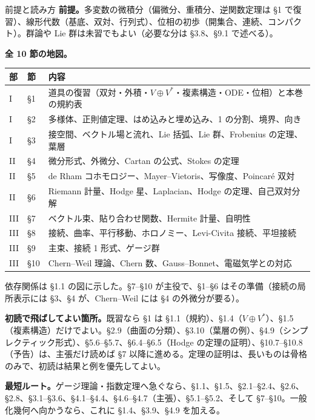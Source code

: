 \clearpage
\begin{keybox}{前提と読み方}
\small
\textbf{前提。}多変数の微積分（偏微分、重積分、逆関数定理は §1 で復習）、線形代数（基底、双対、行列式）、位相の初歩（開集合、連続、コンパクト）。群論や Lie 群は未習でもよい（必要な分は §3.8、§9.1 で述べる）。

\textbf{全 10 節の地図。}
\begin{center}\small
\renewcommand{\arraystretch}{1.2}
\begin{tabular}{@{}ll>{\raggedright\arraybackslash}p{9.2cm}@{}}
\toprule
部 & 節 & 内容 \\
\midrule
I & §1 & 道具の復習（双対・外積・$V\oplus V^*$・複素構造・ODE・位相）と本巻の規約表 \\
I & §2 & 多様体、正則値定理、はめ込みと埋め込み、1 の分割、境界、向き \\
I & §3 & 接空間、ベクトル場と流れ、Lie 括弧、Lie 群、Frobenius の定理、葉層 \\
II & §4 & 微分形式、外微分、Cartan の公式、Stokes の定理 \\
II & §5 & de Rham コホモロジー、Mayer--Vietoris、写像度、Poincaré 双対 \\
II & §6 & Riemann 計量、Hodge 星、Laplacian、Hodge の定理、自己双対分解 \\
III & §7 & ベクトル束、貼り合わせ関数、Hermite 計量、自明性 \\
III & §8 & 接続、曲率、平行移動、ホロノミー、Levi-Civita 接続、平坦接続 \\
III & §9 & 主束、接続 1 形式、ゲージ群 \\
III & §10 & Chern--Weil 理論、Chern 数、Gauss--Bonnet、電磁気学との対応 \\
\bottomrule
\end{tabular}
\end{center}
依存関係は §1.1 の図に示した。§7--§10 が主役で、§1--§6 はその準備（接続の局所表示には §3、§4 が、Chern--Weil には §4 の外微分が要る）。

\textbf{初読で飛ばしてよい箇所。}既習なら §1 は §1.1（規約）、§1.4（$V\oplus V^*$）、§1.5（複素構造）だけでよい。§2.9（曲面の分類）、§3.10（葉層の例）、§4.9（シンプレクティック形式）、§5.6--§5.7、§6.4--§6.5（Hodge の定理の証明）、§10.7--§10.8（予告）は、主張だけ読めば §7 以降に進める。定理の証明は、長いものは骨格のみで、初読は結果と例を優先してよい。

\textbf{最短ルート。}ゲージ理論・指数定理へ急ぐなら、§1.1、§1.5、§2.1--§2.4、§2.6、§2.8、§3.1--§3.6、§4.1--§4.4、§4.6--§4.7（主張）、§5.1--§5.2、そして §7--§10。一般化幾何へ向かうなら、これに §1.4、§3.9、§4.9 を加える。


\end{keybox}
